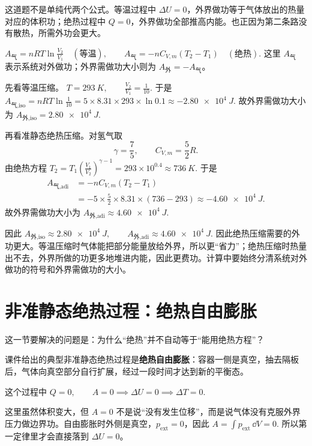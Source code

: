 \documentclass[lang=cn,11pt]{elegantbook}
\begin{document}
\begin{solution}
这道题不是单纯代两个公式。等温过程中 \(\Delta U=0\)，外界做功等于气体放出的热量对应的体积功；绝热过程中 \(Q=0\)，外界做功全部推高内能。也正因为第二条路没有散热，所需外功会更大。

 \(A_{\text{气}}=nRT\ln\frac{V_2}{V_1}\quad(\text{等温}), \qquad A_{\text{气}}=-nC_{V,m}(T_2-T_1)\quad(\text{绝热}).\) 
这里 \(A_{\text{气}}\) 表示系统对外做功；外界需做功大小则为 \(A_{\text{外}}=-A_{\text{气}}\)。


先看等温压缩。
 \(T=\SI{293}{K},\qquad \frac{V_2}{V_1}=\frac{1}{10}.\) 
于是
 \(A_{\text{气,iso}}=nRT\ln\frac{1}{10} =5\times 8.31\times 293\times \ln 0.1 \approx \SI{-2.80e4}{J}.\) 
故外界需做功大小为
 \(A_{\text{外,iso}}=\SI{2.80e4}{J}.\) 

再看准静态绝热压缩。对氢气取
\[
\gamma=\frac75,\qquad C_{V,m}=\frac52 R.
\]
由绝热方程
 \(T_2=T_1\left(\frac{V_1}{V_2}\right)^{\gamma-1} =293\times 10^{0.4}\approx \SI{736}{K}.\) 
于是
\[
\begin{aligned}
A_{\text{气,adi}}
&=-nC_{V,m}(T_2-T_1)\\
&=-5\times \frac52\times 8.31\times (736-293)
\approx \SI{-4.60e4}{J}.
\end{aligned}
\]
故外界需做功大小为
 \(A_{\text{外,adi}}\approx \SI{4.60e4}{J}.\) 

因此
 \(A_{\text{外,iso}}\approx \SI{2.80e4}{J},\qquad A_{\text{外,adi}}\approx \SI{4.60e4}{J}.\) 
因此绝热压缩需要的外功更大。等温压缩时气体能把部分能量放给外界，所以更“省力”；绝热压缩时热量出不去，外界所做的功更多地堆进内能，因此更费功。计算中要始终分清系统对外做功的符号和外界需做功的大小。
\end{solution}

\section{非准静态绝热过程：绝热自由膨胀}

这一节要解决的问题是：为什么“绝热”并不自动等于“能用绝热方程”？

课件给出的典型非准静态绝热过程是\textbf{绝热自由膨胀}：容器一侧是真空，抽去隔板后，气体向真空部分自行扩展，经过一段时间才达到新的平衡态。

这个过程中
 \(Q=0,\qquad A=0 \implies \Delta U=0 \implies \Delta T=0.\) 

\begin{note}
这里虽然体积变大，但 \(A=0\) 不是说“没有发生位移”，而是说气体没有克服外界压力做边界功。自由膨胀时外侧是真空，\(p_{\text{ext}}=0\)，因此
 \(A=\int p_{\text{ext}}\,\dd V=0.\) 
所以第一定律里才会直接落到 \(\Delta U=0\)。
\end{note}
\end{document}
